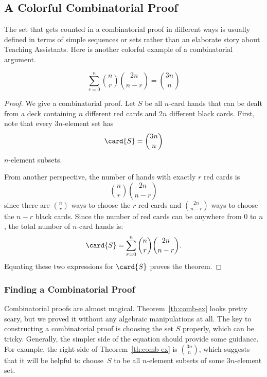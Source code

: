 \subsection{A Colorful Combinatorial Proof} 

The set that gets counted in a combinatorial proof in different ways
is usually defined in terms of simple sequences or sets rather than an
elaborate story about Teaching Assistants.  Here is another colorful
example of a combinatorial argument.

\begin{theorem}
\label{th:comb-ex}
\[
\sum_{r=0}^n \binom{n}{r} \binom{2n}{n-r} = \binom{3n}{n}
\]
\end{theorem}

\begin{proof}
We give a combinatorial proof.  Let $S$ be all $n$-card hands that can
be dealt from a deck containing $n$ different red cards and $2n$
different black cards.  First, note that every $3n$-element set has
%
\[
\card{S} = \binom{3n}{n}
\]
%
$n$-element subsets.

From another perspective, the number of hands with exactly $r$ red
cards is
%
\[
\binom{n}{r} \binom{2n}{n - r}
\]
%
since there are $\binom{n}{r}$ ways to choose the $r$ red cards and
$\binom{2n}{n - r}$ ways to choose the $n - r$ black cards.  Since the
number of red cards can be anywhere from 0 to $n$, the total number of
$n$-card hands is:
%
\[
    \card{S} = \sum_{r=0}^n \binom{n}{r} \binom{2n}{n-r}.
\]
%
Equating these two expressions for $\card{S}$ proves the theorem.
\end{proof}

\subsubsection{Finding a Combinatorial Proof}

Combinatorial proofs are almost magical.  Theorem~\ref{th:comb-ex}
looks pretty scary, but we proved it without any algebraic
manipulations at all.  The key to constructing a combinatorial proof
is choosing the set $S$ properly, which can be tricky.  Generally, the
simpler side of the equation should provide some guidance.  For
example, the right side of Theorem~\ref{th:comb-ex} is
$\binom{3n}{n}$, which suggests that it will be helpful to choose~$S$
to be all $n$-element subsets of some $3n$-element set.

\begin{problems}
\classproblems
{}


\homeworkproblems
{}

\end{problems}


\endinput
